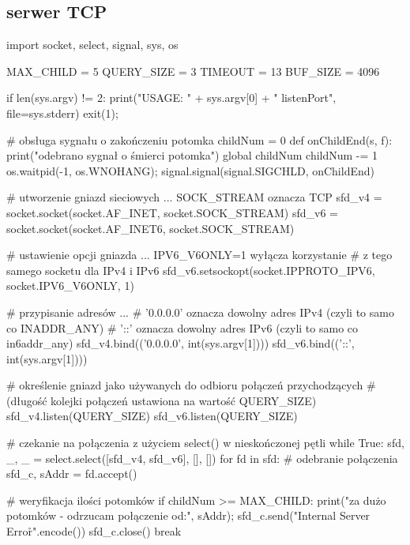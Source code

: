\subsection{serwer TCP}
\begin{CodeFrame*}[python]{}
import socket, select, signal, sys, os

MAX_CHILD = 5
QUERY_SIZE = 3
TIMEOUT = 13
BUF_SIZE = 4096

if len(sys.argv) != 2:
    print("USAGE: " + sys.argv[0] + " listenPort", file=sys.stderr)
    exit(1);

# obsługa sygnału o zakończeniu potomka
childNum = 0
def onChildEnd(s, f):
    print("odebrano sygnał o śmierci potomka")
    global childNum
    childNum -= 1
    os.waitpid(-1, os.WNOHANG);
signal.signal(signal.SIGCHLD, onChildEnd)

# utworzenie gniazd sieciowych ... SOCK_STREAM oznacza TCP
sfd_v4 = socket.socket(socket.AF_INET,  socket.SOCK_STREAM)
sfd_v6 = socket.socket(socket.AF_INET6, socket.SOCK_STREAM)

# ustawienie opcji gniazda ... IPV6_V6ONLY=1 wyłącza korzystanie
# z tego samego socketu dla IPv4 i IPv6
sfd_v6.setsockopt(socket.IPPROTO_IPV6, socket.IPV6_V6ONLY, 1)

# przypisanie adresów ...
# '0.0.0.0' oznacza dowolny adres IPv4 (czyli to samo co INADDR_ANY)
# '::' oznacza dowolny adres IPv6 (czyli to samo co in6addr_any)
sfd_v4.bind(('0.0.0.0', int(sys.argv[1])))
sfd_v6.bind(('::',      int(sys.argv[1])))

# określenie gniazd jako używanych do odbioru połączeń przychodzących
# (długość kolejki połączeń ustawiona na wartość QUERY_SIZE)
sfd_v4.listen(QUERY_SIZE)
sfd_v6.listen(QUERY_SIZE)

# czekanie na połączenia z użyciem select() w nieskończonej pętli
while True:
    sfd, _, _ = select.select([sfd_v4, sfd_v6], [], [])
    for fd in sfd:
        #  odebranie połączenia
        sfd_c, sAddr = fd.accept()
        
        # weryfikacja ilości potomków
        if childNum >= MAX_CHILD:
            print("za dużo potomków - odrzucam połączenie od:", sAddr);
            sfd_c.send("Internal Server Error\r\n".encode())
            sfd_c.close()
            break
        

\end{CodeFrame*}
